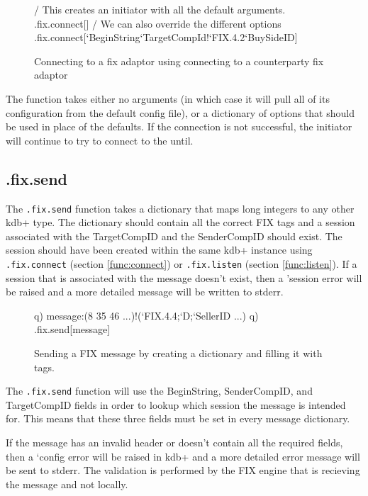 \begin{figure}[H]
\begin{qcode}
/ This creates an initiator with all the default arguments.
.fix.connect[]
/ We can also override the different options
.fix.connect[`BeginString`TargetCompId!`FIX.4.2`BuySideID]
\end{qcode}
\caption{Connecting to a fix adaptor using connecting to a counterparty fix adaptor}
\end{figure}

The function takes either no arguments (in which case it will pull all of its configuration from the default config file), or a dictionary of options that
should be used in place of the defaults. If the connection is not successful, the
initiator will continue to try to connect to the until.

\subsection{.fix.send}
\label{func:send}

The \texttt{.fix.send} function takes a dictionary that maps long integers to any other kdb+ type. The dictionary should contain all the correct FIX tags and a session associated with the TargetCompID and the SenderCompID should exist. The session should have been created within the same kdb+ instance using \texttt{.fix.connect} (section \ref{func:connect}) or \texttt{.fix.listen} (section \ref{func:listen}). If a session that is associated with the message doesn't exist, then a 'session error will be raised and a more detailed message will be written to stderr.

\begin{figure}[H]
\begin{qcode}
q) message:(8 35 46 ...)!(`FIX.4.4;`D;`SellerID ...)
q) .fix.send[message]
\end{qcode}
\caption{Sending a FIX message by creating a dictionary and filling it with tags.}
\end{figure}

The \texttt{.fix.send} function will use the BeginString, SenderCompID, and TargetCompID fields in order to lookup which session the message is intended for.
This means that these three fields must be set in every message dictionary. 

If the message has an invalid header or doesn't contain all the required fields, then a `config error will be raised in kdb+ and a more detailed error message will be sent to stderr. The validation is performed by the FIX engine that is recieving the message
and not locally.

